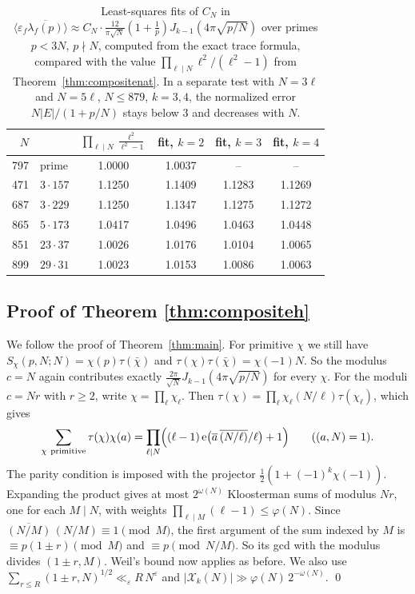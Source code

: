 \documentclass[11pt]{amsart}
\theoremstyle{remark}
\newcommand{\eps}{\varepsilon}
\newcommand{\e}{\mathrm{e}}
\newcommand{\cX}{\mathcal{X}}
\newcommand{\ov}{\overline}
\begin{document}
\begin{table}[t]
\centering
\begin{tabular}{rlcccc}
\toprule
$N$ & & $\prod_{\ell\mid N}\frac{\ell^2}{\ell^2-1}$ & fit, $k=2$ & fit, $k=3$ & fit, $k=4$\\
\midrule
797 & prime & 1.0000 & 1.0037 & -- & -- \\
471 & $3\cdot157$ & 1.1250 & 1.1409 & 1.1283 & 1.1269\\
687 & $3\cdot229$ & 1.1250 & 1.1347 & 1.1275 & 1.1272\\
865 & $5\cdot173$ & 1.0417 & 1.0496 & 1.0463 & 1.0448\\
851 & $23\cdot37$ & 1.0026 & 1.0176 & 1.0104 & 1.0065\\
899 & $29\cdot31$ & 1.0023 & 1.0153 & 1.0086 & 1.0063\\
\bottomrule
\end{tabular}
\caption{Least-squares fits of $C_N$ in $\langle\eps_f\ov{\lambda_f(p)}\rangle\approx C_N\cdot\frac{12}{\pi\sqrt N}(1+\frac1p)J_{k-1}(4\pi\sqrt{p/N})$ over primes $p<3N$, $p\nmid N$, computed from the exact trace formula, compared with the value $\prod_{\ell\mid N}\ell^2/(\ell^2-1)$ from Theorem~\ref{thm:compositenat}. In a separate test with $N=3\ell$ and $N=5\ell$, $N\le879$, $k=3,4$, the normalized error $N|E|/(1+p/N)$ stays below $3$ and decreases with $N$.}\label{tab:comp}
\end{table}

\subsection{Proof of Theorem \ref{thm:compositeh}}
We follow the proof of Theorem~\ref{thm:main}. For primitive $\chi$ we still have $S_\chi(p,N;N)=\chi(p)\tau(\bar\chi)$ and $\tau(\chi)\tau(\bar\chi)=\chi(-1)N$. So the modulus $c=N$ again contributes exactly $\frac{2\pi}{\sqrt N}J_{k-1}(4\pi\sqrt{p/N})$ for every $\chi$. For the moduli $c=Nr$ with $r\ge2$, write $\chi=\prod_\ell\chi_\ell$. Then $\tau(\chi)=\prod_\ell\chi_\ell(N/\ell)\tau(\chi_\ell)$, which gives
\begin{equation}\label{eq:primsum}
\sum_{\chi\ \mathrm{primitive}}\tau(\chi)\chi(a)=\prod_{\ell\mid N}\Bigl((\ell-1)\,\e\bigl(\overline{a}\,\overline{(N/\ell)}/\ell\bigr)+1\Bigr)\qquad((a,N)=1).
\end{equation}
The parity condition is imposed with the projector $\frac12(1+(-1)^k\chi(-1))$. Expanding the product gives at most $2^{\omega(N)}$ Kloosterman sums of modulus $Nr$, one for each $M\mid N$, with weights $\prod_{\ell\mid M}(\ell-1)\le\varphi(N)$. Since $\overline{(N/M)}\,(N/M)\equiv1\pmod M$, the first argument of the sum indexed by $M$ is $\equiv p(1\pm r)\pmod M$ and $\equiv p\pmod{N/M}$. So its gcd with the modulus divides $(1\pm r,M)$. Weil's bound now applies as before. We also use $\sum_{r\le R}(1\pm r,N)^{1/2}\ll_\varepsilon R\,N^{\varepsilon}$ and $|\cX_k(N)|\gg\varphi(N)\,2^{-\omega(N)}$. \qed
\end{document}

